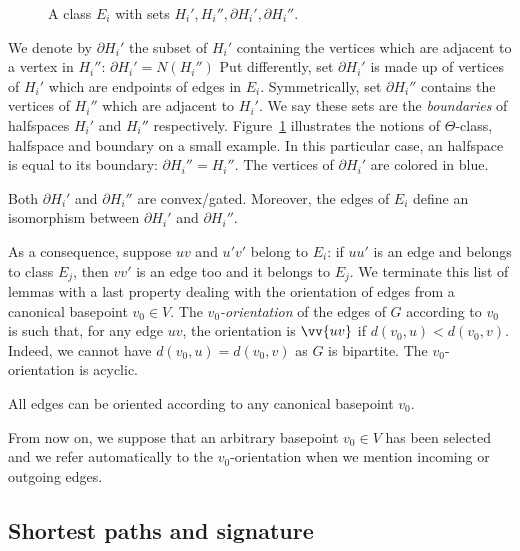 \documentclass[a4paper,UKenglish,numberwithinsect,cleveref, autoref]{lipics-v2021}
\begin{document}
\begin{figure}[h]
\centering
\scalebox{0.7}{}
\caption{A class $E_i$ with sets $H_i', H_i'', \partial H_i', \partial H_i''$.}
\label{fig:halfspaces}
\end{figure}

We denote by $\partial H_i'$ the subset of $H_i'$ containing the vertices which are adjacent to a vertex in $H_i''$: $\partial H_i' = N(H_i'')$ Put differently, set $\partial H_i'$ is made up of vertices of $H_i'$ which are endpoints of edges in $E_i$. Symmetrically, set $\partial H_i''$ contains the vertices of $H_i''$ which are adjacent to $H_i'$. We say these sets are the \textit{boundaries} of halfspaces $H_i'$ and $H_i''$ respectively. Figure~\ref{fig:halfspaces} illustrates the notions of $\Theta$-class, halfspace and boundary on a small example. In this particular case, an halfspace is equal to its boundary: $\partial H_i'' = H_i''$. The vertices of $\partial H_i'$ are colored in blue.

\begin{lemma}
Both $\partial H_i'$ and $\partial H_i''$ are convex/gated. Moreover, the edges of $E_i$ define an isomorphism between $\partial H_i'$ and $\partial H_i''$.
\label{le:boundaries}
\end{lemma}


As a consequence, suppose $uv$ and $u'v'$ belong to $E_i$: if $uu'$ is an edge and belongs to class $E_j$, then $vv'$ is an edge too and it belongs to $E_j$. We terminate this list of lemmas with a last property dealing with the orientation of edges  from a canonical basepoint $v_0 \in V$. The \textit{$v_0$-orientation} of the edges of $G$ according to $v_0$ is such that, for any edge $uv$, the orientation is $\vv{uv}$ if $d(v_0,u) < d(v_0,v)$. Indeed, we cannot have $d(v_0,u) = d(v_0,v)$ as $G$ is bipartite. The $v_0$-orientation is acyclic.

\begin{lemma}
All edges can be oriented according to any canonical basepoint $v_0$.
\end{lemma}

From now on, we suppose that an arbitrary basepoint $v_0 \in V$ has been selected and we refer automatically to the $v_0$-orientation when we mention incoming or outgoing edges.

\subsection{Shortest paths and signature}
\end{document}
